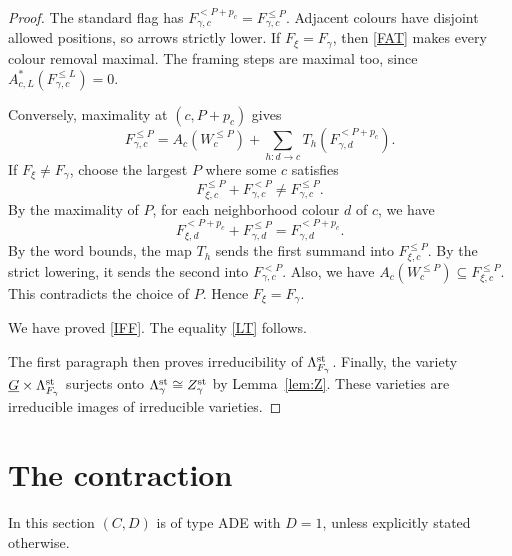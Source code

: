 \documentclass[11pt,reqno]{amsart}
\theoremstyle{definition}
\theoremstyle{remark}
\def\dG{\underline G}
\begin{document}
\begin{proof}
The standard flag has
$F_{\gamma,c}^{<P+p_c}=F_{\gamma,c}^{\leqslant P}$.
Adjacent colours have disjoint allowed positions, so arrows strictly lower.
If $F_\xi=F_\gamma$, then \eqref{FAT} makes every colour removal maximal. The framing steps are maximal too, since
$A^*_{c,L}(F_{\gamma,c}^{\leqslant L})=0$.

Conversely, maximality at $(c,P+p_c)$ gives
\[
 F_{\gamma,c}^{\leqslant P}=A_c(W_c^{\leqslant P})+
       \sum_{h:d\to c}T_h(F_{\gamma,d}^{<P+p_c}).
\]
If $F_\xi\ne F_\gamma$, choose the largest $P$ where some $c$ satisfies
$$F_{\xi,c}^{\leqslant P}+F_{\gamma,c}^{<P}\ne F_{\gamma,c}^{\leqslant P}.$$
By the maximality of $P$, for each neighborhood colour $d$ of $c$, we have
$$F_{\xi,d}^{<P+p_c}+F_{\gamma,d}^{\leqslant P}=F_{\gamma,d}^{<P+p_c}.$$
By the word bounds, the map $T_h$ sends the first summand into $F_{\xi,c}^{\leqslant P}$.
By the strict lowering, it sends the second into $F_{\gamma,c}^{<P}$.
Also, we have  $A_c(W_c^{\leqslant P})\subseteq F_{\xi,c}^{\leqslant P}$.
This contradicts the choice of $P$.
Hence $F_\xi=F_\gamma$.

We have proved \eqref{IFF}. The equality \eqref{LT} follows.

The first paragraph then proves
irreducibility of $\Lambda_{F_\gamma}^{\rm st}$. Finally, the variety
$\dG\times\Lambda_{F_\gamma}^{\rm st}$ surjects onto
$\Lambda_\gamma^{\rm st}\cong Z_\gamma^{\rm st}$ by
Lemma~\ref{lem:Z}. These varieties
are irreducible images of irreducible varieties.
\end{proof}




\section{The contraction}\label{sec:sym}


In this section  $(C,D)$ is of type ADE with $D=1$, unless explicitly stated otherwise.
\end{document}

